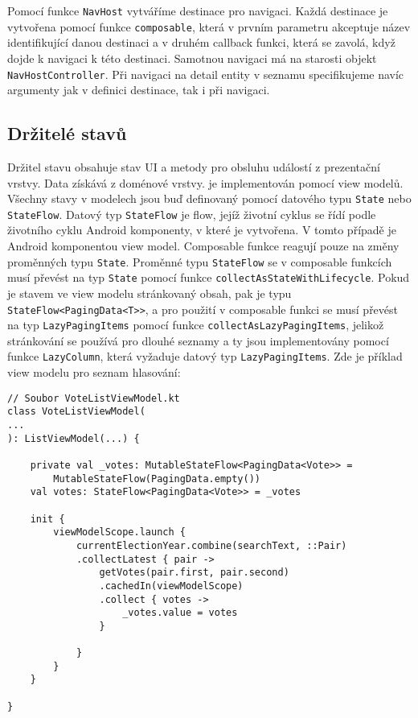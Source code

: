 \noindent Pomocí funkce \lstinline|NavHost| vytváříme destinace pro navigaci. Každá destinace je vytvořena pomocí funkce \lstinline|composable|, která v prvním parametru akceptuje název identifikující danou destinaci \linebreak a v druhém callback funkci, která se zavolá,  když dojde k navigaci k této destinaci. Samotnou navigaci má na starosti objekt \lstinline|NavHostController|. Při navigaci na detail entity v seznamu specifikujeme navíc argumenty jak v definici destinace, tak i při navigaci.

\subsection*{Držitelé stavů}
Držitel stavu obsahuje stav UI a metody pro obsluhu událostí z prezentační vrstvy. Data získává z doménové vrstvy. je implementován pomocí view modelů. Všechny stavy v modelech jsou buď definovaný pomocí datového typu \lstinline|State| nebo \lstinline|StateFlow|. Datový typ \lstinline|StateFlow| je \linebreak flow, jejíž životní cyklus se řídí podle životního cyklu Android komponenty, v které je vytvořena. \linebreak V tomto případě je Android komponentou view model. Composable funkce reagují pouze na změny proměnných typu \lstinline|State|. Proměnné typu \lstinline|StateFlow| se v composable funkcích musí převést na typ \lstinline|State| pomocí funkce \lstinline|collectAsStateWithLifecycle|. Pokud je stavem ve view modelu stránkovaný obsah, pak je typu \lstinline|StateFlow<PagingData<T>>|, a pro použití v composable funkci se musí převést na typ \lstinline|LazyPagingItems| pomocí funkce \lstinline|collectAsLazyPagingItems|, jelikož stránkování se používá pro dlouhé seznamy a ty jsou implementovány pomocí funkce \lstinline|LazyColumn|, která vyžaduje datový typ \lstinline|LazyPagingItems|. Zde je příklad view modelu pro seznam hlasování:

\begin{lstlisting}[caption={Ukázka využití view modelu}, label={lst:view-model}, tabsize=2]
// Soubor VoteListViewModel.kt
class VoteListViewModel(
...
): ListViewModel(...) {
	
	private val _votes: MutableStateFlow<PagingData<Vote>> =
		MutableStateFlow(PagingData.empty())
	val votes: StateFlow<PagingData<Vote>> = _votes
	
	init {
		viewModelScope.launch {
			currentElectionYear.combine(searchText, ::Pair)
			.collectLatest { pair ->
				getVotes(pair.first, pair.second)
				.cachedIn(viewModelScope)
				.collect { votes ->
					_votes.value = votes
				}
				
			}
		}
	}
	
}
\end{lstlisting}

